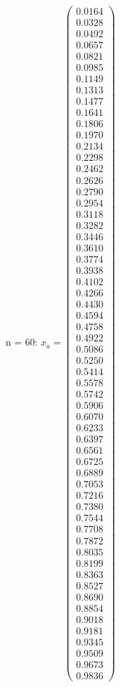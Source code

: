 \documentclass{udpreport}
\begin{document}
\begin{enumerate}
\begin{enumerate}
{{{{\begin{itemize}
					 n = 60:	
					$x_{a} = \left(\begin{array}{c} 0.0164\\ 0.0328\\ 0.0492\\ 0.0657\\ 0.0821\\ 0.0985\\ 0.1149\\ 0.1313\\ 0.1477\\ 0.1641\\ 0.1806\\ 0.1970\\ 0.2134\\ 0.2298\\ 0.2462\\ 0.2626\\ 0.2790\\ 0.2954\\ 0.3118\\ 0.3282\\ 0.3446\\ 0.3610\\ 0.3774\\ 0.3938\\ 0.4102\\ 0.4266\\ 0.4430\\ 0.4594\\ 0.4758\\ 0.4922\\ 0.5086\\ 0.5250\\ 0.5414\\ 0.5578\\ 0.5742\\ 0.5906\\ 0.6070\\ 0.6233\\ 0.6397\\ 0.6561\\ 0.6725\\ 0.6889\\ 0.7053\\ 0.7216\\ 0.7380\\ 0.7544\\ 0.7708\\ 0.7872\\ 0.8035\\ 0.8199\\ 0.8363\\ 0.8527\\ 0.8690\\ 0.8854\\ 0.9018\\ 0.9181\\ 0.9345\\ 0.9509\\ 0.9673\\ 0.9836 \end{array}\right)$
			

\end{itemize}}}}}
\end{enumerate}
\end{enumerate}
\end{document}
